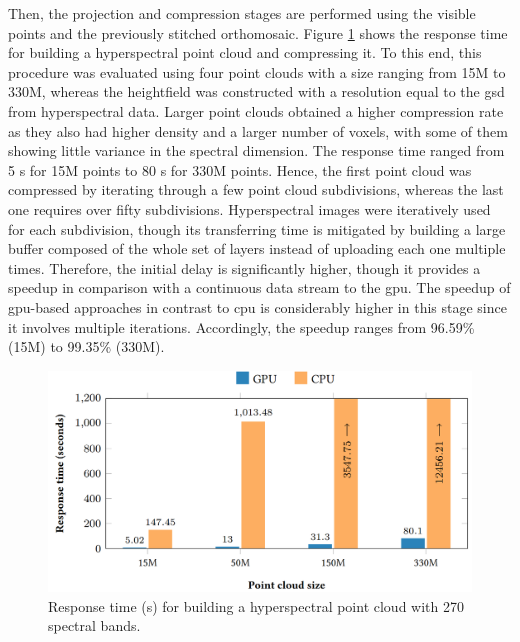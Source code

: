 Then, the projection and compression stages are performed using the visible points and the previously stitched orthomosaic. Figure \ref{fig:hyper_compression_results} shows the response time for building a hyperspectral point cloud and compressing it. To this end, this procedure was evaluated using four point clouds with a size ranging from 15M to 330M, whereas the heightfield was constructed with a resolution equal to the \acrshort{gsd} from hyperspectral data. Larger point clouds obtained a higher compression rate as they also had higher density and a larger number of voxels, with some of them showing little variance in the spectral dimension. The response time ranged from 5 \si{\second} for 15M points to 80 \si{\second} for 330M points. Hence, the first point cloud was compressed by iterating through a few point cloud subdivisions, whereas the last one requires over fifty subdivisions. Hyperspectral images were iteratively used for each subdivision, though its transferring time is mitigated by building a large buffer composed of the whole set of layers instead of uploading each one multiple times. Therefore, the initial delay is significantly higher, though it provides a speedup in comparison with a continuous data stream to the \acrshort{gpu}. The speedup of \acrshort{gpu}-based approaches in contrast to \acrshort{cpu} is considerably higher in this stage since it involves multiple iterations. Accordingly, the speedup ranges from 96.59\% (15M) to 99.35\% (330M).

\begin{figure}[bt]
    \centering
    \includegraphics[width=\linewidth]{figs/hyper_point_cloud/compression_results.png}
	\caption{Response time (\si{\second}) for building a hyperspectral point cloud with 270 spectral bands. }
	\label{fig:hyper_compression_results}
\end{figure}

